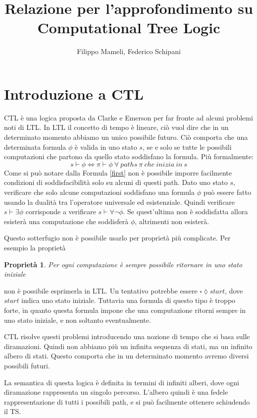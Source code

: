 \documentclass{article}
\title{Relazione per l'approfondimento su Computational Tree Logic}
\author{Filippo Mameli, Federico Schipani}
\newtheorem{prop}{Proprietà}
\begin{document}
\maketitle
\tableofcontents
\section{Introduzione a \ac*{CTL}}
\ac*{CTL} è una logica proposta da Clarke e Emerson per far fronte ad alcuni problemi noti di \ac{LTL}. In \ac{LTL} il concetto di tempo è lineare, ciò vuol dire che in un determinato momento abbiamo un unico possibile futuro. Ciò comporta che una determinata formula $\phi$ è valida in uno stato $s$, se e solo se tutte le possibili computazioni che partono da quello stato soddisfano la formula. Più formalmente:
\begin{equation}\label{first}
    s \vdash \phi \iff \pi \vdash \phi \ \forall \  paths \  \pi \ che\  inizia\  in\  s
\end{equation}
Come si può notare dalla Formula \eqref{first} non è possibile imporre facilmente condizioni di soddisfacibilità solo su alcuni di questi path. Dato uno stato $s$, verificare che solo alcune computazioni soddisfano una formula $\phi$ può essere fatto usando la dualità tra l'operatore universale ed esistenziale. Quindi verificare  $ s \vdash  \exists \phi $ corrisponde a verificare $s \vdash \forall \neg \phi $. Se quest'ultima non è soddisfatta allora esisterà una computazione che soddisferà $\phi$, altrimenti non esisterà. \par
Questo sotterfugio non è possibile usarlo per proprietà più complicate. Per esempio la proprietà
\begin{prop}
\label{prop:first}
Per ogni computazione è sempre possibile ritornare in uno stato iniziale 
\end{prop}
non è possibile esprimerla in \ac{LTL}. Un tentativo potrebbe essere $\square\lozenge start$, dove $start$ indica uno stato iniziale. Tuttavia una formula di questo tipo è troppo forte, in quanto questa formula impone che una computazione ritorni sempre in uno stato iniziale, e non soltanto eventualmente. \par
\ac{CTL} risolve questi problemi introducendo una nozione di tempo che si basa sulle diramazioni. Quindi non abbiamo più un infinita sequenza di stati, ma un infinito albero di stati. Questo comporta che in un determinato momento avremo diversi possibili futuri.\par
La semantica di questa logica è definita in termini di infiniti alberi, dove ogni diramazione rappresenta un singolo percorso. L'albero quindi è una fedele rappresentazione di tutti i possibili path, e si può facilmente ottenere schiudendo il \ac{TS}.\par
\end{document}
